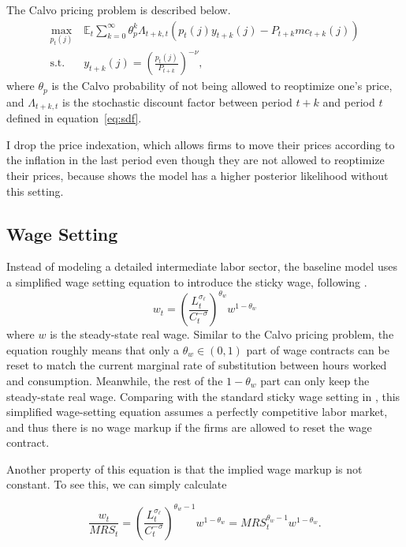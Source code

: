     The Calvo pricing problem is described below.
    \begin{equation}
        \begin{aligned}
        \max\limits_{p_t(j)}\, &\mathbb{E}_t \sum_{k=0}^{\infty} \theta_p^k \Lambda_{t+k, t} \left(p_t(j) y_{t+k}(j) - P_{t+k} mc_{t+k}(j)\right) \\
        \text{s.t.   } & y_{t+k}(j) = \left(\frac{p_t(j)}{P_{t+k}}\right)^{-\nu},
        \end{aligned}
    \end{equation}
    where $\theta_p$ is the Calvo probability of not being allowed to reoptimize one's price, and $\Lambda_{t+k, t}$ is the stochastic discount factor between period $t+k$ and period $t$ defined in equation~\eqref{eq:sdf}.

    I drop the price indexation, which allows firms to move their prices according to the inflation in the last period even though they are not allowed to reoptimize their prices, because \cite{smetsShocksFrictionsUS2007} shows the model has a higher posterior likelihood without this setting.

    \subsection{Wage Setting}
    Instead of modeling a detailed intermediate labor sector, the baseline model uses a simplified wage setting equation to introduce the sticky wage, following \cite{nireiOriginsPropagationAnimal}.
    \begin{equation}
        w_t = \left(\frac{L_t^{\sigma_\ell}}{C_t^{-\sigma}}\right)^{\theta_w} w^{1 - \theta_w}
    \end{equation}
    where $w$ is the steady-state real wage. Similar to the Calvo pricing problem, the equation roughly means that only a $\theta_w \in (0,1)$ part of wage contracts can be reset to match the current marginal rate of substitution between hours worked and consumption. Meanwhile, the rest of the $1 - \theta_w$ part can only keep the steady-state real wage. Comparing with the standard sticky wage setting in \cite{erceg2000optimal}, this simplified wage-setting equation assumes a perfectly competitive labor market, and thus there is no wage markup if the firms are allowed to reset the wage contract.

    Another property of this equation is that the implied wage markup is not constant. To see this, we can simply calculate 
    
    $$\frac{w_t}{MRS_t} = \left(\frac{L_t^{\sigma_\ell}}{C_t^{-\sigma}}\right)^{ \theta_w - 1} w^{1 - \theta_w} = MRS_t^{\theta_w - 1}w^{1 - \theta_w}.$$

